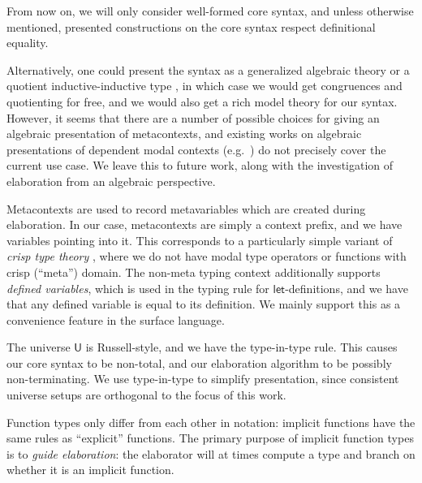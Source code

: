 \documentclass[acmsmall,review,anonymous,prologue,dvipsnames]{acmart}\settopmatter{printfolios=true,printccs=false,printacmref=false}
\newcommand{\slet}{\boldsymbol{\mathsf{let}}}
\renewcommand{\U}{\mathsf{U}}
\theoremstyle{remark}
\begin{document}
From now on, we will only consider well-formed core syntax, and unless otherwise
mentioned, presented constructions on the core syntax respect definitional
equality.

Alternatively, one could present the syntax as a generalized algebraic theory
\cite{sterling2019algebraic} or a quotient inductive-inductive type
\cite{ttintt}, in which case we would get congruences and quotienting for free,
and we would also get a rich model theory for our syntax. However, it seems that
there are a number of possible choices for giving an algebraic presentation of
metacontexts, and existing works on algebraic presentations of dependent modal
contexts (e.g.\ \cite{birkedal2018modal}) do not precisely cover the current use
case. We leave this to future work, along with the investigation of elaboration
from an algebraic perspective.

Metacontexts are used to record metavariables which are created during
elaboration. In our case, metacontexts are simply a context prefix, and we have
variables pointing into it. This corresponds to a particularly simple variant of
\emph{crisp type theory} \cite{licata2018internal}, where we do not have modal
type operators or functions with crisp (``meta'') domain. The non-meta typing
context additionally supports \emph{defined variables}, which is used in the
typing rule for $\slet$-definitions, and we have that any defined variable is
equal to its definition. We mainly support this as a convenience feature in the
surface language.

The universe $\U$ is Russell-style, and we have the type-in-type rule.
This causes our core syntax to be non-total, and our elaboration algorithm to be
possibly non-terminating. We use type-in-type to simplify presentation, since
consistent universe setups are orthogonal to the focus of this work.

Function types only differ from each other in notation: implicit
functions have the same rules as ``explicit'' functions. The primary purpose of
implicit function types is to \emph{guide elaboration}: the elaborator will at
times compute a type and branch on whether it is an implicit function.
\end{document}
